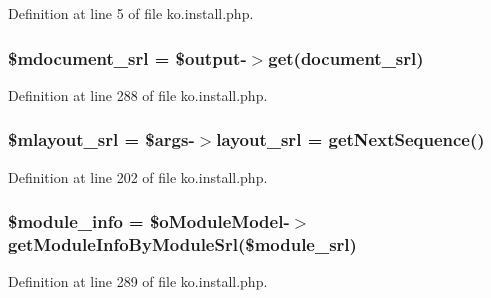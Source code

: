 Definition at line 5 of file ko.\+install.\+php.

\hypertarget{ko_8install_8php_a27c211d9a984964f84c8ffb6ea7328fc}{}
\subsubsection[{\$mdocument\+\_\+srl}]{\setlength{\rightskip}{0pt plus 5cm}\$mdocument\+\_\+srl = \$output-\/$>$get(\textquotesingle{}document\+\_\+srl\textquotesingle{})}\label{ko_8install_8php_a27c211d9a984964f84c8ffb6ea7328fc}


Definition at line 288 of file ko.\+install.\+php.

\hypertarget{ko_8install_8php_a576210f0eec2e42df2c40e04a3972bb0}{}
\subsubsection[{\$mlayout\+\_\+srl}]{\setlength{\rightskip}{0pt plus 5cm}\${\bf mlayout\+\_\+srl} = \$args-\/$>${\bf layout\+\_\+srl} = {\bf get\+Next\+Sequence}()}\label{ko_8install_8php_a576210f0eec2e42df2c40e04a3972bb0}


Definition at line 202 of file ko.\+install.\+php.

\hypertarget{ko_8install_8php_a5e701819149f6ea0893d4b79010417d3}{}
\subsubsection[{\$module\+\_\+info}]{\setlength{\rightskip}{0pt plus 5cm}\$module\+\_\+info = \$o\+Module\+Model-\/$>$get\+Module\+Info\+By\+Module\+Srl(\${\bf module\+\_\+srl})}\label{ko_8install_8php_a5e701819149f6ea0893d4b79010417d3}


Definition at line 289 of file ko.\+install.\+php.

\hypertarget{ko_8install_8php_ae40aed4d7a99050245e66ca2a82949ed}{}

